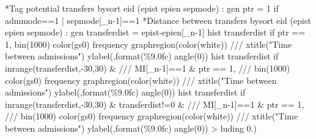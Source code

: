 *Tag potential transfers
bysort eid (epist epien sepmode) : gen ptr = 1 if admmode==1 | sepmode[_n-1]==1
*Distance between transfers
bysort eid (epist epien sepmode) : gen transferdist = epist-epien[_n-1]
hist transferdist if ptr == 1, bin(1000) color(gs0) frequency graphregion(color(white)) ///
xtitle("Time between admissions") ylabel(,format(\%9.0fc) angle(0))
hist transferdist if inrange(transferdist,-30,30) \& ///
MI[_n-1]==1 \& ptr == 1, ///
bin(1000) color(gs0) frequency graphregion(color(white)) ///
xtitle("Time between admissions") ylabel(,format(\%9.0fc) angle(0))
hist transferdist if inrange(transferdist,-30,30) \& transferdist!=0 \& ///
MI[_n-1]==1 \& ptr == 1, ///
bin(1000) color(gs0) frequency graphregion(color(white)) ///
xtitle("Time between admissions") ylabel(,format(\%9.0fc) angle(0))
> luding 0.)

